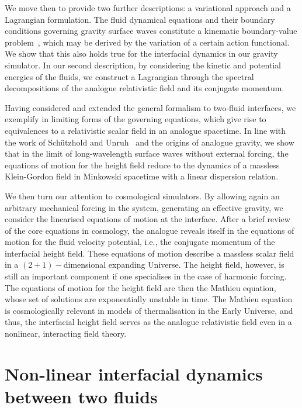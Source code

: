 \documentclass[a4paper]{jpconf}
\begin{document}
We move then to provide two further descriptions: a variational approach and a Lagrangian formulation. The fluid dynamical equations and their boundary conditions governing gravity surface waves constitute a kinematic boundary-value problem~\cite{Miles1976NonlinearBasins,serrin1959mathematical}, which may be derived by the variation of a certain action functional. We show that this also holds true for the interfacial dynamics in our gravity simulator. In our second description, by considering the kinetic and potential energies of the fluids, we construct a Lagrangian through the spectral decompositions of the analogue relativistic field and its conjugate momentum.

Having considered and extended the general formalism to two-fluid interfaces, we exemplify in  limiting forms of the governing equations, which give rise to equivalences to a relativistic scalar field in an analogue spacetime. In line with the work of Sch{\"u}tzhold and Unruh~\cite{schutzhold2002gravity} and the origins of analogue gravity, we show that in the limit of long-wavelength surface waves without external forcing, the equations of motion for the height field reduce to the dynamics of a massless Klein-Gordon field in Minkowski spacetime with a linear dispersion relation. 

We then turn our attention to cosmological simulators. By allowing again an arbitrary mechanical forcing in the system, generating an effective gravity, we consider the linearised equations of motion at the interface. After a brief review of the core equations in cosmology, the analogue reveals itself in the equations of motion for the fluid velocity potential, i.e., the conjugate momentum of the interfacial height field. These equations of motion describe a massless scalar field in a $(2+1)-$dimensional expanding Universe. The height field, however, is still an important component if one specialises in the case of harmonic forcing. The equations of motion for the height field are then the Mathieu equation, whose set of solutions are exponentially unstable in time. The Mathieu equation is cosmologically relevant in models of thermalisation in the Early Universe, and thus, the interfacial height field serves as the analogue relativistic field even in a nonlinear, interacting field theory.

\section{Non-linear interfacial dynamics between two fluids}\label{sec::interfacial dynamics}
\end{document}
